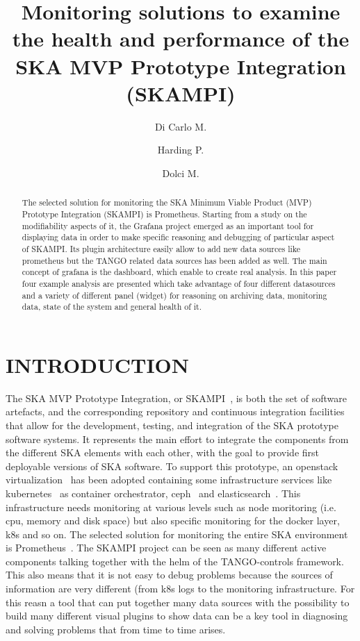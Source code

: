 \documentclass[]{spie}  %
\title{Monitoring solutions to examine the health and performance of the SKA MVP Prototype Integration (SKAMPI)}
\author[a]{Di Carlo M.}
\author[b]{Harding P.}
\author[a]{Dolci M.}
\affil[a]{INAF Osservatorio Astronomico d'Abruzzo, Teramo, Italy}
\affil[b]{SKA Organisation, Macclesfield, UK}
\begin{document}
 
\maketitle

\begin{abstract}
The selected solution for monitoring the SKA Minimum Viable Product (MVP) Prototype Integration (SKAMPI) is Prometheus. Starting from a study on the modifiability aspects of it, the Grafana project emerged as an important tool for displaying data in order to make specific reasoning and debugging of particular aspect of SKAMPI. Its plugin architecture easily allow to add new data sources like prometheus but the TANGO related data sources has been added as well. The main concept of grafana is the dashboard, which enable to create real analysis. In this paper four example analysis are presented which take advantage of four different datasources and a variety of different panel (widget) for reasoning on archiving data, monitoring data, state of the system and general health of it.
\end{abstract}


\section{INTRODUCTION} 
\label{sec:intro}  %

The SKA MVP Prototype Integration, or SKAMPI~\cite{SKAMPI}, is both the set of software artefacts, and the corresponding repository and continuous integration facilities that allow for the development, testing, and integration of the SKA prototype software systems. It represents the main effort to integrate the components from the different SKA elements with each other, with the goal to provide first deployable versions of SKA software. 
To support this prototype, an openstack virtualization~\cite{openstack} has been adopted containing some infrastructure services like kubernetes~\cite{kubernetes} as container orchestrator, ceph~\cite{ceph} and elasticsearch~\cite{elastic}. 
This infrastructure needs monitoring at various levels such as node moritoring (i.e. cpu, memory and disk space) but also specific monitoring for the docker layer, k8s and so on. The selected solution for monitoring the entire SKA environment is Prometheus~\cite{prometheus}.
The SKAMPI project can be seen as many different active components talking together with the helm of the TANGO-controls framework. This also means that it is not easy to debug problems because the sources of information are very different (from k8s logs to the monitoring infrastructure. For this reasn a tool that can put together many data sources with the possibility to build many different visual plugins to show data can be a key tool in diagnosing and solving problems that from time to time arises. 
\end{document}
